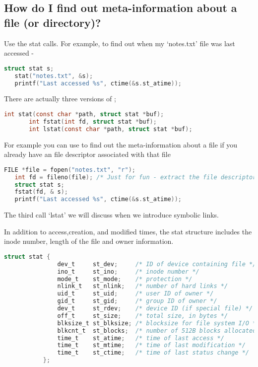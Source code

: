 \subsection{How do I find out meta-information about a file (or directory)?}\label{how-do-i-find-out-meta-information-about-a-file-or-directory}

Use the stat calls. For example, to find out when my `notes.txt' file was last accessed -

\begin{lstlisting}[language=C]
   struct stat s;
   stat("notes.txt", &s);
   printf("Last accessed %s", ctime(&s.st_atime));
\end{lstlisting}

There are actually three versions of ;

\begin{lstlisting}[language=C]
       int stat(const char *path, struct stat *buf);
       int fstat(int fd, struct stat *buf);
       int lstat(const char *path, struct stat *buf);
\end{lstlisting}

For example you can use  to find out the meta-information about a file if you already have an file descriptor associated with that file

\begin{lstlisting}[language=C]
   FILE *file = fopen("notes.txt", "r");
   int fd = fileno(file); /* Just for fun - extract the file descriptor from a C FILE struct */
   struct stat s;
   fstat(fd, & s);
   printf("Last accessed %s", ctime(&s.st_atime));
\end{lstlisting}

The third call `lstat' we will discuss when we introduce symbolic links.

In addition to access,creation, and modified times, the stat structure includes the inode number, length of the file and owner information.

\begin{lstlisting}[language=C]
struct stat {
               dev_t     st_dev;     /* ID of device containing file */
               ino_t     st_ino;     /* inode number */
               mode_t    st_mode;    /* protection */
               nlink_t   st_nlink;   /* number of hard links */
               uid_t     st_uid;     /* user ID of owner */
               gid_t     st_gid;     /* group ID of owner */
               dev_t     st_rdev;    /* device ID (if special file) */
               off_t     st_size;    /* total size, in bytes */
               blksize_t st_blksize; /* blocksize for file system I/O */
               blkcnt_t  st_blocks;  /* number of 512B blocks allocated */
               time_t    st_atime;   /* time of last access */
               time_t    st_mtime;   /* time of last modification */
               time_t    st_ctime;   /* time of last status change */
           };
\end{lstlisting}

